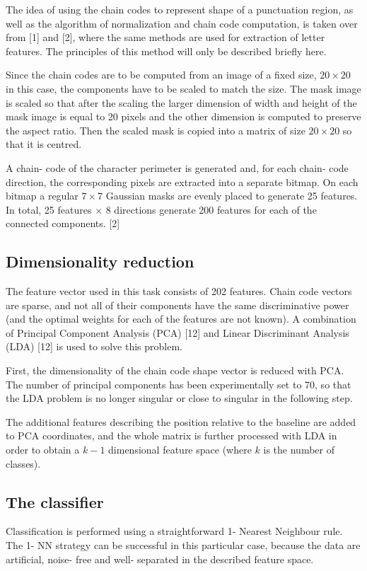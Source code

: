 \documentclass[12pt,a4paper]{report}
\begin{document}
The idea of using the chain codes to represent shape of a punctuation region, as well as the algorithm of normalization and chain code computation, is taken over from [1] and [2], where the same methods are used for extraction of letter features. The principles of this method will only be described briefly here.

Since the chain codes are to be computed from an image of a fixed size, $20 \times 20$ in this case, the components have to be scaled to match the size. The mask image is scaled so that after the scaling the larger dimension of width and height of the mask image is equal to 20 pixels and the other dimension is computed to preserve the aspect ratio. Then the scaled mask is copied into a matrix of size $20 \times 20$ so that it is centred.

A chain- code of the character perimeter is generated and, for each chain- code direction, the corresponding pixels are extracted into a separate bitmap. On each bitmap a regular $7 \times 7$ Gaussian masks are evenly placed to generate 25 features. In total, 25 features $\times$ 8 directions generate 200 features for each of the connected components. [2]

\subsection{Dimensionality reduction}
The feature vector used in this task consists of 202 features. Chain code vectors are sparse, and not all of their components have the same discriminative power (and the optimal weights for each of the features are not known). A combination of Principal Component Analysis (PCA) [12] and Linear Discriminant Analysis (LDA) [12] is used to solve this problem.

First, the dimensionality of the chain code shape vector is reduced with PCA. The number of principal components has been experimentally set to 70, so that the LDA problem is no longer singular or close to singular in the following step.

The additional features describing the position relative to the baseline are added to PCA coordinates, and the whole matrix is further processed with LDA in order to obtain a $k - 1$ dimensional feature space (where $k$ is the number of classes).

\subsection{The classifier}
Classification is performed using a straightforward 1- Nearest Neighbour rule. The 1- NN strategy can be successful in this particular case, because the data are artificial, noise- free and well- separated in the described feature space.
\end{document}
